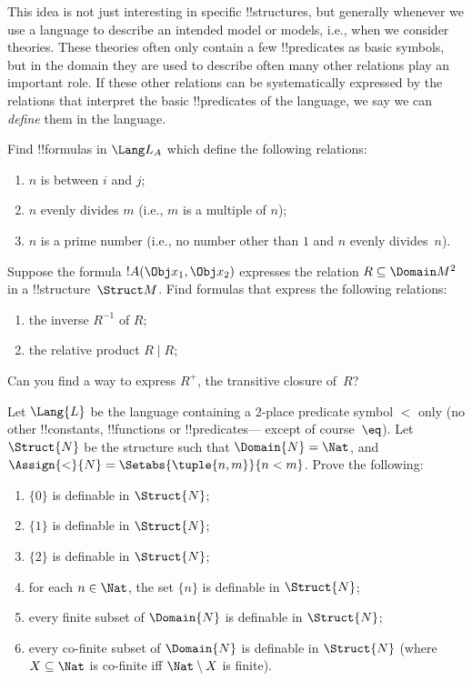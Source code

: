 \documentclass[../../include/open-logic-section]{subfiles}
\begin{document}
This idea is not just interesting in specific !!{structure}s, but
generally whenever we use a language to describe an intended model or
models, i.e., when we consider theories. These theories often only
contain a few !!{predicate}s as basic symbols, but in the domain they
are used to describe often many other relations play an important
role.  If these other relations can be systematically expressed by the
relations that interpret the basic !!{predicate}s of the language, we
say we can \emph{define} them in the language.

\begin{prob}
Find !!{formula}s in $\Lang L_A$ which define the following relations:
\begin{enumerate}
\item $n$ is between $i$ and $j$;
\item $n$ evenly divides $m$ (i.e., $m$ is a multiple of $n$);
\item $n$ is a prime number (i.e., no number other than $1$ and $n$ evenly
  divides~$n$).
\end{enumerate}
\end{prob}

\begin{prob}
Suppose the formula $!A(\Obj x_1, \Obj x_2)$ expresses the relation $R
\subseteq \Domain M^2$ in a !!{structure}~$\Struct M$. Find formulas
that express the following relations:
\begin{enumerate}
\item the inverse $R^{-1}$ of $R$;
\item the relative product $R \mid R$;
\end{enumerate}
Can you find a way to express $R^+$, the transitive closure of~$R$?
\end{prob}

\begin{prob}
Let $\Lang{L}$ be the language containing a 2-place predicate symbol
$<$ only (no other !!{constant}s, !!{function}s or !!{predicate}s---
except of course~$\eq$). Let $\Struct{N}$ be the structure such that
$\Domain{N} = \Nat$, and $\Assign{<}{N} = \Setabs{\tuple{n,m}}{n <
  m}$. Prove the following:
\begin{enumerate}
\item $\{ 0 \}$ is definable in $\Struct{N}$;
\item $\{ 1 \}$ is definable in $\Struct{N}$;
\item $\{ 2 \}$ is definable in $\Struct{N}$;
\item for each $n \in \Nat$, the set $\{ n \}$ is definable in
  $\Struct{N}$;
\item every finite subset of $\Domain{N}$ is definable in
  $\Struct{N}$;
\item every co-finite subset of $\Domain{N}$ is definable in
  $\Struct{N}$ (where $X \subseteq \Nat$ is co-finite iff
  $\Nat \setminus X$ is finite).
\end{enumerate}
\end{prob}
\end{document}
